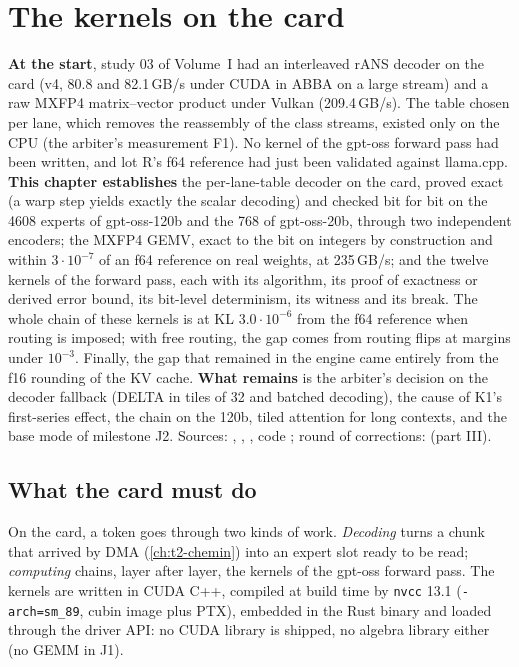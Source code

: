 \chapter{The kernels on the card}\label{ch:t2-noyaux}
\ifdefined\GrapheNoyDecodeur\else\fi

\begin{origine}
\textbf{At the start}, study 03 of Volume~I had an interleaved rANS decoder on the card (v4, 80.8 and 82.1\,GB/s under CUDA in ABBA on a large stream) and a raw MXFP4 matrix--vector product under Vulkan (209.4\,GB/s). The table chosen per lane, which removes the reassembly of the class streams, existed only on the CPU (the arbiter's measurement F1). No kernel of the gpt-oss forward pass had been written, and lot R's f64 reference had just been validated against llama.cpp.
\textbf{This chapter establishes} the per-lane-table decoder on the card, proved exact (a warp step yields exactly the scalar decoding) and checked bit for bit on the \num{4608} experts of gpt-oss-120b and the 768 of gpt-oss-20b, through two independent encoders; the MXFP4 GEMV, exact to the bit on integers by construction and within $3\cdot10^{-7}$ of an f64 reference on real weights, at 235\,GB/s; and the twelve kernels of the forward pass, each with its algorithm, its proof of exactness or derived error bound, its bit-level determinism, its witness and its break. The whole chain of these kernels is at KL $3.0\cdot10^{-6}$ from the f64 reference when routing is imposed; with free routing, the gap comes from routing flips at margins under $10^{-3}$. Finally, the gap that remained in the engine came entirely from the f16 rounding of the KV cache.
\textbf{What remains} is the arbiter's decision on the decoder fallback (DELTA in tiles of 32 and batched decoding), the cause of K1's first-series effect, the chain on the 120b, tiled attention for long contexts, and the base mode of milestone J2.
Sources: , , , code ; round of corrections:  (part III).
\end{origine}

\section{What the card must do}\label{sec:t2n-tache}

On the card, a token goes through two kinds of work. \emph{Decoding} turns a chunk that arrived by DMA (\cref{ch:t2-chemin}) into an expert slot ready to be read; \emph{computing} chains, layer after layer, the kernels of the gpt-oss forward pass. The kernels are written in CUDA C++, compiled at build time by \texttt{nvcc} 13.1 (\texttt{-arch=sm\_89}, cubin image plus PTX), embedded in the Rust binary and loaded through the driver API: no CUDA library is shipped, no algebra library either (no GEMM in J1).

